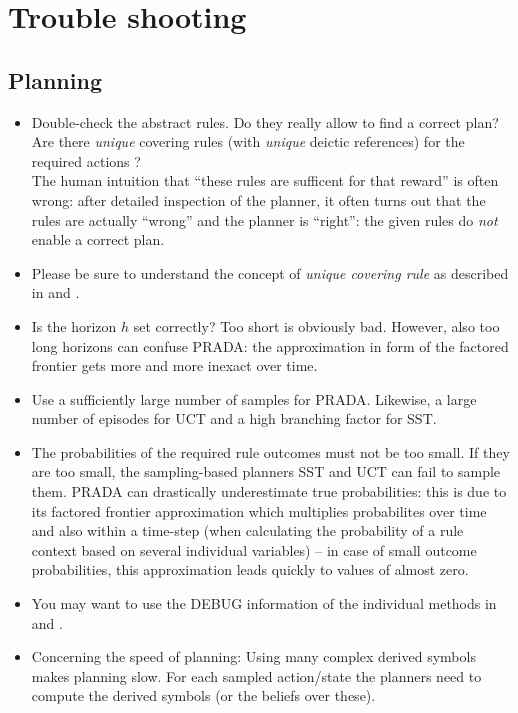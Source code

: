 \documentclass[10pt,twoside,twocolumn,fleqn]{article}
\begin{document}

\section{Trouble shooting}

\subsection{Planning}
\begin{itemize}
\item Double-check the abstract rules. Do they really allow to find a
correct plan? Are there \emph{unique} covering rules (with \emph{unique}
deictic references) for the required actions ? \\
The human intuition that ``these rules are sufficent for that reward'' is
often wrong: after detailed inspection of the planner, it often turns out
that the rules are actually ``wrong'' and the planner is ``right'': the
given rules do \emph{not} enable a correct plan.

\item Please be sure to understand the concept of \emph{unique covering
rule} as described in \citet{pasula07ai} and \citet{lang-toussaint-10jair}.

\item Is the horizon $h$ set correctly? Too short is obviously bad.
However, also too long horizons can confuse PRADA: the approximation in
form of the factored frontier gets more and more inexact over time.

\item Use a sufficiently large number of samples 
for PRADA. Likewise, a large number of episodes for UCT and a high
branching factor for SST.

\item The probabilities of the required rule outcomes must not be too
small. If they are too small, the sampling-based planners SST and UCT	
can fail to sample them. PRADA can drastically underestimate true
probabilities: this is due to its factored frontier approximation which
multiplies probabilites over time and also within a time-step
(when calculating the probability of a rule context based on
several individual variables) -- in case of small outcome probabilities,
this approximation leads quickly to values of almost zero.

\item You may want to use the DEBUG information of the individual methods
in  and .

\item Concerning the speed of planning: Using many complex derived
symbols makes planning slow. For each sampled action/state the planners
need to compute the derived symbols (or the beliefs over these).
\end{itemize}
\end{document}

